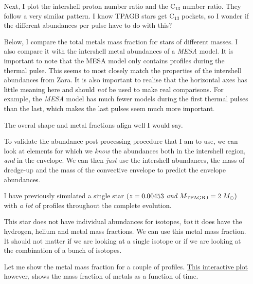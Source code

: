\documentclass[a4paper,10pt]{article}
\begin{document}
\nextpage


Next, I plot the intershell proton number ratio and the C\(_{13}\) number ratio. They follow a very similar pattern. I know TPAGB stars get C\(_{13}\) pockets, so I wonder if the different abundances per pulse have to do with this?
\begin{figure}[ht]
    \centering
\end{figure}

Below, I compare the total metals mass fraction for stars of different masses. I also compare it with the intershell metal abundances of a \emph{MESA} model. It is important to note that the MESA model only contains profiles during the thermal pulse. This seems to most closely match the properties of the intershell abundances from Zara. It is also important to realise that the horizontal axes has little meaning here and should \emph{not} be used to make real comparisons. For example, the \emph{MESA} model has much fewer models during the first thermal pulses than the last, which makes the last pulses seem much more important.
 
\begin{figure}[ht]
    \centering
\end{figure}

The overal shape and metal fractions align well I would say.

To validate the abundance post-processing procedure that I am to use, we can look at elements for which we \emph{know} the abundances both in the intershell region, \emph{and} in the envelope. We can then \emph{just} use the intershell abundances, the mass of dredge-up and the mass of the convective envelope to predict the envelope abundances.

I have previously simulated a single star \((z=0.00453 \emph{ and } M_\text{TPAGB,i} = 2\;M_\odot )\) with \emph{a lot} of profiles throughout the complete evolution.

This star does not have individual abundances for isotopes, \emph{but} it does have the hydrogen, helium and metal mass fractions. We can use this metal mass fraction. It should not matter if we are looking at a single isotope or if we are looking at the combination of a bunch of isotopes.

Let me show the metal mass fraction for a couple of profiles. \href{https://s-koen.github.io/figures/#/plots/master-internship/w21/dredge-up}{This interactive plot} however, shows the mass fraction of metals as a function of time.
\end{document}
